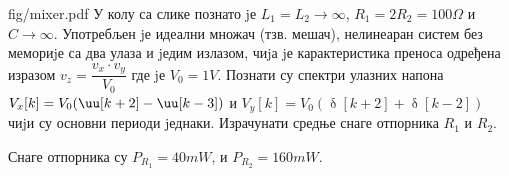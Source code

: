 \begin{slikaDesno}{fig/mixer.pdf}
    \PID 
    У колу са слике познато jе $L_1 = L_2 \to \infty$, 
    $R_1 = 2 R_2 = 100\unit{\Omega}$ и 
    $C \to \infty$. 
    Употребљен jе идеални множач (тзв. мешач), нелинеаран систем без мемориjе са два улаза и jедим излазом,
    чиjа jе карактеристика преноса одређена изразом 
    $v_z = \dfrac{v_x \cdot v_y}{V_0}$
    где jе $V_0 = 1\unit{V}$. 
    Познати су спектри улазних напона 
    $V_x[k] = V_0 (\uu[k + 2] - \uu[k - 3])$ и
    $V_y[k] = V_0 (\updelta[k + 2] + \updelta[k - 2])$ чиjи су основни
    периоди jеднаки. Израчунати средње снаге отпорника $R_1$ и $R_2$.
\end{slikaDesno}

\REZULTAT Снаге отпорника су 
$P_{R_1} = 40\unit{mW}$, и 
$P_{R_2} = 160\unit{mW}$.